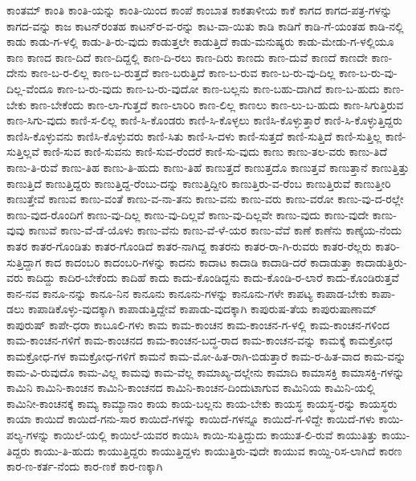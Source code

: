 ಕಾಂತಮ್
ಕಾಂತಿ
ಕಾಂತಿ-ಯನ್ನು
ಕಾಂತಿ-ಯಿಂದ
ಕಾಂಪೆ
ಕಾಂಬಾತ
ಕಾಕತಾಳೀಯ
ಕಾಕೆ
ಕಾಗದ
ಕಾಗದ-ಪತ್ರ-ಗಳನ್ನು
ಕಾಗದ-ವನ್ನು
ಕಾಜ
ಕಾಟನ್‌ರಂತಹ
ಕಾಟನ್‌ರ-ವ-ರನ್ನು
ಕಾಟ-ವಾ-ಯಿತು
ಕಾಡಿ
ಕಾಡಿಗೆ
ಕಾಡಿ-ಗೆ-ಯಂತಹ
ಕಾಡಿ-ನಲ್ಲಿ
ಕಾಡು
ಕಾಡು-ಗ-ಳಲ್ಲಿ
ಕಾಡು-ತಿ-ರು-ವುದು
ಕಾಡುತ್ತಲೇ
ಕಾಡುತ್ತಿದೆ
ಕಾಡು-ಮನುಷ್ಯರು
ಕಾಡು-ಮೇಡು-ಗ-ಳಲ್ಲಿಯೂ
ಕಾಣ
ಕಾಣದ
ಕಾಣ-ದಿದೆ
ಕಾಣ-ದಿದ್ದಲ್ಲಿ
ಕಾಣ-ದಿ-ರಲು
ಕಾಣ-ದಿರು
ಕಾಣದು
ಕಾಣ-ದುವೆ
ಕಾಣದೆ
ಕಾಣದೇ
ಕಾಣ-ದೇನು
ಕಾಣ-ಬ-ರ-ಲಿಲ್ಲ
ಕಾಣ-ಬ-ರುತ್ತದೆ
ಕಾಣ-ಬರುತ್ತಿದೆ
ಕಾಣ-ಬ-ರುವ
ಕಾಣ-ಬ-ರು-ವು-ದಿಲ್ಲ
ಕಾಣ-ಬ-ರು-ವು-ದಿಲ್ಲ-ವೆಂದೂ
ಕಾಣ-ಬ-ರು-ವುದು
ಕಾಣ-ಬ-ರು-ವುದೋ
ಕಾಣ-ಬಲ್ಲನು
ಕಾಣ-ಬಹು-ದಾಗಿದೆ
ಕಾಣ-ಬ-ಹುದು
ಕಾಣ-ಬೇಕು
ಕಾಣ-ಬೇಕೆಂದು
ಕಾಣ-ಲಾ-ಗುತ್ತದೆ
ಕಾಣ-ಲಾರಿರಿ
ಕಾಣ-ಲಿಲ್ಲ
ಕಾಣಲು
ಕಾಣ-ಲು-ಬ-ಹುದು
ಕಾಣ-ಸಿಗುತ್ತಿರುವ
ಕಾಣ-ಸಿಗು-ವುದು
ಕಾಣಿ-ಸ-ಲಿಲ್ಲ
ಕಾಣಿ-ಸಿ-ಕೊಂಡರು
ಕಾಣಿ-ಸಿ-ಕೊಳ್ಳಲು
ಕಾಣಿಸಿ-ಕೊಳ್ಳುತ್ತಾರೆ
ಕಾಣಿ-ಸಿ-ಕೊಳ್ಳುತ್ತಿದ್ದರು
ಕಾಣಿಸಿ-ಕೊಳ್ಳುವನು
ಕಾಣಿಸಿ-ಕೊಳ್ಳುವರು
ಕಾಣಿ-ಸಿತು
ಕಾಣಿ-ಸಿ-ದಳು
ಕಾಣಿ-ಸುತ್ತದೆ
ಕಾಣಿ-ಸುತ್ತಿದೆ
ಕಾಣಿ-ಸುತ್ತಿಲ್ಲ
ಕಾಣಿ-ಸುತ್ತಿಲ್ಲವೆ
ಕಾಣಿ-ಸುವ
ಕಾಣಿ-ಸುವನು
ಕಾಣಿ-ಸುವ-ರೆಂದರೆ
ಕಾಣಿ-ಸು-ವುದು
ಕಾಣು
ಕಾಣು-ತಲ-ವರು
ಕಾಣು-ತಿದೆ
ಕಾಣು-ತಿ-ರುವೆ
ಕಾಣು-ತಿಹ
ಕಾಣು-ತಿ-ಹುದು
ಕಾಣು-ತಿಹೆ
ಕಾಣುತ್ತದೆ
ಕಾಣುತ್ತದೊ
ಕಾಣುತ್ತವೆ
ಕಾಣುತ್ತಾನೆ
ಕಾಣುತ್ತಿತ್ತು
ಕಾಣುತ್ತಿದೆ
ಕಾಣುತ್ತಿದ್ದರು
ಕಾಣುತ್ತಿದ್ದ-ರೆಂಬು-ದನ್ನು
ಕಾಣುತ್ತಿದ್ದೀರಿ
ಕಾಣುತ್ತಿರು-ವ-ರೆಂಬ
ಕಾಣುತ್ತಿರುವೆ
ಕಾಣುತ್ತೀರಿ
ಕಾಣುತ್ತೇವೆ
ಕಾಣುವ
ಕಾಣು-ವಂತೆ
ಕಾಣು-ವ-ನಾ-ತನು
ಕಾಣು-ವನು
ಕಾಣು-ವರು
ಕಾಣು-ವರೋ
ಕಾಣು-ವು-ದ-ರಲ್ಲೇ
ಕಾಣು-ವುದ-ರೊಂದಿಗೆ
ಕಾಣು-ವು-ದಿಲ್ಲ
ಕಾಣು-ವು-ದಿಲ್ಲವೆ
ಕಾಣು-ವು-ದಿಲ್ಲವೇ
ಕಾಣು-ವುದು
ಕಾಣು-ವುದೇ
ಕಾಣು-ವುವು
ಕಾಣುವೆ
ಕಾಣು-ವೆ-ಡೆ-ಯೊಳು
ಕಾಣು-ವೆನು
ಕಾಣು-ವೆ-ಳೆ-ಯರ
ಕಾಣು-ವೆವೆ
ಕಾಣೆ
ಕಾಣೆನು
ಕಾಣ್ಕೆಯ-ನೆಂದು
ಕಾತರ
ಕಾತರ-ಗೊಂಡಿತು
ಕಾತರ-ಗೊಂಡಿದೆ
ಕಾತರ-ನಾಗಿದ್ದ
ಕಾತರನು
ಕಾತರ-ರಾ-ಗಿ-ರುವರು
ಕಾತರ-ರೆಲ್ಲರು
ಕಾತರಿ-ಸುತ್ತಿದ್ದಾಗ
ಕಾದ
ಕಾದಂಬರಿ
ಕಾದಂಬರಿ-ಗಳನ್ನು
ಕಾದನು
ಕಾದಾಟ
ಕಾದಾಡಿ
ಕಾದಾಡಿ-ದರೆ
ಕಾದಾಡುತ್ತಾ
ಕಾದಾಡುತ್ತಿರು-ವರು
ಕಾದಿದ್ದು
ಕಾದಿರ-ಬೇಕೆಂದು
ಕಾದಿಹೆ
ಕಾದು
ಕಾದು-ಕೊಂಡಿದ್ದನು
ಕಾದು-ಕೊಂಡಿ-ರ-ಲಾರೆ
ಕಾದು-ಕೊಂಡಿರುತ್ತವೆ
ಕಾನ-ನವ
ಕಾನೂ-ನನ್ನು
ಕಾನೂ-ನಿನ
ಕಾನೂನು
ಕಾನೂನು-ಗಳನ್ನು
ಕಾನೂನು-ಗಳೇ
ಕಾಪಟ್ಯ
ಕಾಪಾಡ-ಬೇಕು
ಕಾಪಾ-ಡಲು
ಕಾಪಾಡಿಕೊಳ್ಳು-ವುದಕ್ಕಾಗಿ
ಕಾಪಾಡುತ್ತಿದ್ದೇವೆ
ಕಾಪಾಡು-ವುದಕ್ಕಾಗಿ
ಕಾಪುರುಷ-ತೆಯ
ಕಾಪುರುಷಾಣಾಮ್
ಕಾಪುರುಷ್
ಕಾಪೇ-ಧರಾ
ಕಾಬೂಲಿ-ಗಳು
ಕಾಮ
ಕಾಮ-ಕಾಂಚನ
ಕಾಮ-ಕಾಂಚನ-ಗ-ಳಲ್ಲಿ
ಕಾಮ-ಕಾಂಚನ-ಗಳಿಂದ
ಕಾಮ-ಕಾಂಚನ-ಗಳಿಗೆ
ಕಾಮ-ಕಾಂಚನದ
ಕಾಮ-ಕಾಂಚನ-ಬದ್ಧ-ರಾದ
ಕಾಮ-ಕಾಂಚನ-ವನ್ನು
ಕಾಮಕ್ಕೆ
ಕಾಮಕ್ರೋಧ
ಕಾಮಕ್ರೋಧ-ಗಳ
ಕಾಮಕ್ರೋಧ-ಗಳಿಗೆ
ಕಾಮನೆ
ಕಾಮ-ಮೋ-ಹಿತ-ರಾಗಿ-ಬಿಡುತ್ತಾರೆ
ಕಾಮ-ರ-ಹಿತ-ವಾದ
ಕಾಮ-ವನ್ನು
ಕಾಮ-ವಿ-ರುವುದೊ
ಕಾಮ-ವಿಲ್ಲ
ಕಾಮವು
ಕಾಮ-ವೆಲ್ಲ
ಕಾಮಾಖ್ಯ-ದಲ್ಲೇನು
ಕಾಮಾದಿ
ಕಾಮಾಸಕ್ತಿ
ಕಾಮಾಸಕ್ತಿ-ಗಳನ್ನು
ಕಾಮಿನಿ
ಕಾಮಿನಿ-ಕಾಂಚನ
ಕಾಮಿನಿ-ಕಾಂಚನದ
ಕಾಮಿನಿ-ಕಾಂಚನ-ದಿಂದುಟಾಗುವ
ಕಾಮಿನಿಯ
ಕಾಮಿನಿ-ಯಲ್ಲಿ
ಕಾಮಿನೀ-ಕಾಂಚನಕ್ಕೆ
ಕಾಮ್ಯ
ಕಾಮ್ಯಾನಾಂ
ಕಾಯ
ಕಾಯ-ಬಲ್ಲನು
ಕಾಯ-ಬೇಕು
ಕಾಯಸ್ಥ
ಕಾಯಸ್ಥ-ರನ್ನು
ಕಾಯಸ್ಥರು
ಕಾಯಾ
ಕಾಯಿದೆ
ಕಾಯಿದೆ-ಗನು-ಸಾರ
ಕಾಯಿದೆ-ಗಳನ್ನು
ಕಾಯಿದೆ-ಗಳನ್ನೂ
ಕಾಯಿದೆ-ಗ-ಳಿದ್ದೇ
ಕಾಯಿದೆ-ಗಳು
ಕಾಯಿ-ಪಲ್ಯ-ಗಳನ್ನು
ಕಾಯಿಲೆ-ಯಲ್ಲಿ
ಕಾಯಿಲೆ-ಯವರ
ಕಾಯಿಸಿ
ಕಾಯಿ-ಸುತ್ತಿದ್ದುದು
ಕಾಯುತ-ಲಿ-ರುವೆ
ಕಾಯುತಿತ್ತು
ಕಾಯು-ತಿದ್ದರು
ಕಾಯು-ತಿ-ಹುದು
ಕಾಯುತ್ತಿದ್ದರು
ಕಾಯುತ್ತಿದ್ದಳು
ಕಾಯುತ್ತಿರು-ವುದೇ
ಕಾಯುವ
ಕಾಯ್ದಿ-ರಿಸ-ಲಾಗಿದೆ
ಕಾರಣ
ಕಾರ-ಣ-ಕರ್ತ-ನೆಂದು
ಕಾರ-ಣಕೆ
ಕಾರ-ಣಕ್ಕಾಗಿ
